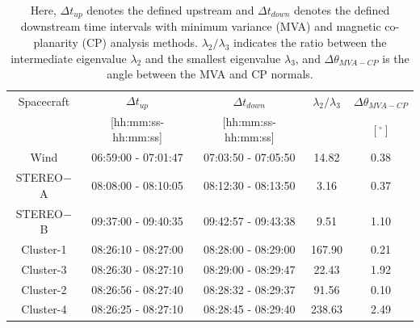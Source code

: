 \documentclass[draft]{agujournal2019}
\begin{document}
%
%

\pagebreak
 


\vfill

\pagebreak

\begin{table}[h]
\centering
\caption{Here, $\Delta t_{up}$ denotes the defined upstream and $\Delta t_{down}$ denotes the defined downstream time intervals with minimum variance (MVA) and magnetic co-planarity (CP) analysis methods. $\lambda_{2}/\lambda_{3}$ indicates the ratio between the intermediate eigenvalue $\lambda_{2}$ and the smallest eigenvalue $\lambda_{3}$, and $\Delta\theta_{MVA-CP}$ is the angle between the MVA and CP normals.\label{tab:timeintervalsmay}}
\begin{tabular}{ccccc}
\hline 
Spacecraft & $\Delta t_{up}$ & $\Delta t_{down}$ & $\lambda_{2}/\lambda_{3}$ & $\Delta\theta_{MVA-CP}$\\
& [hh:mm:ss-hh:mm:ss] & [hh:mm:ss-hh:mm:ss] &  & $\left[{}^{\circ}\right]$\\
\hline
Wind & 06:59:00 - 07:01:47 & 07:03:50 - 07:05:50 & 14.82 & 0.38\\ 
STEREO$-$A & 08:08:00 - 08:10:05& 08:12:30 - 08:13:50& 3.16 & 0.37\\ 
STEREO$-$B & 09:37:00 - 09:40:35& 09:42:57 - 09:43:38& 9.51 & 1.10\\ 
Cluster-1 & 08:26:10 - 08:27:00& 08:28:00 - 08:29:00& 167.90 & 0.21\\ 
Cluster-3 & 08:26:30 - 08:27:10& 08:29:00 - 08:29:47& 22.43 & 1.92\\ 
Cluster-2 & 08:26:56 - 08:27:40& 08:28:32 - 08:29:37& 91.56 & 0.10\\ 
Cluster-4 & 08:26:25 - 08:27:10& 08:28:45 - 08:29:40& 238.63 & 2.49\\
\end{tabular}
\end{table}

\pagebreak
\end{document}
